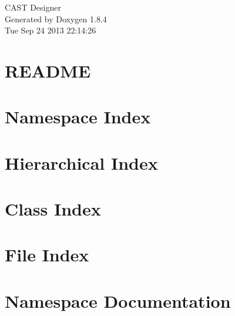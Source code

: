 \documentclass[twoside]{book}
\newcommand{\clearemptydoublepage}{%
  \newpage{\pagestyle{empty}\cleardoublepage}%
}
\begin{document}
\hypersetup{pageanchor=false}
\begin{titlepage}
\vspace*{7cm}
\begin{center}%
{\Large C\-A\-S\-T Designer }\\
\vspace*{1cm}
{\large Generated by Doxygen 1.8.4}\\
\vspace*{0.5cm}
{\small Tue Sep 24 2013 22:14:26}\\
\end{center}
\end{titlepage}
\clearemptydoublepage
\tableofcontents
\clearemptydoublepage
{}
\hypersetup{pageanchor=true}

\chapter{R\-E\-A\-D\-M\-E}
\label{md_README}
\hypertarget{md_README}{}

\chapter{Namespace Index}

\chapter{Hierarchical Index}

\chapter{Class Index}

\chapter{File Index}

\chapter{Namespace Documentation}




























\end{document}
